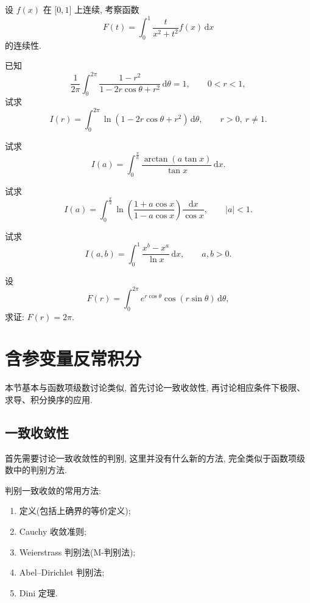 \documentclass[../数学分析培优讲义.tex]{subfiles}
\begin{document}
\begin{example}
设 $f(x)$ 在 $\lbrack0,1\rbrack$ 上连续, 考察函数
\[
    F(t)=\int_0^1\dfrac{t}{x^2+t^2}f(x)\,\mathrm{d}x
\]
的连续性.
\end{example}
\exampleblank

\begin{example}
已知
\[
    \dfrac{1}{2\pi}\int_0^{2\pi}\dfrac{1-r^2}{1-2r\cos\theta+r^2}\,\mathrm{d}\theta=1,
    \qquad 0<r<1,
\]
试求
\[
    I(r)=\int_0^{2\pi}\ln(1-2r\cos\theta+r^2)\,\mathrm{d}\theta,
    \qquad r>0,\ r\ne1.
\]
\end{example}
\exampleblank

\begin{example}
试求
\[
    I(a)=\int_0^{\frac{\pi}{a}}\dfrac{\arctan(a\tan x)}{\tan x}\,\mathrm{d}x.
\]
\end{example}
\exampleblank

\begin{example}
试求
\[
    I(a)=\int_0^{\frac{\pi}{2}}\ln\left(\dfrac{1+a\cos x}{1-a\cos x}\right)\dfrac{\mathrm{d}x}{\cos x},
    \qquad |a|<1.
\]
\end{example}
\exampleblank

\begin{example}
试求
\[
    I(a,b)=\int_0^1\dfrac{x^b-x^a}{\ln x}\,\mathrm{d}x,
    \qquad a,b>0.
\]
\end{example}
\exampleblank

\begin{example}
设
\[
    F(r)=\int_0^{2\pi}e^{r\cos\theta}\cos(r\sin\theta)\,\mathrm{d}\theta,
\]
求证: $F(r)=2\pi$.
\end{example}
\exampleblank


\newpage

\section{含参变量反常积分}

本节基本与函数项级数讨论类似, 首先讨论一致收敛性, 再讨论相应条件下极限、求导、积分换序的应用.


\newpage

\subsection{一致收敛性}

首先需要讨论一致收敛性的判别, 这里并没有什么新的方法, 完全类似于函数项级数中的判别方法.

判别一致收敛的常用方法:
\begin{enumerate}[label=\textcircled{\arabic*},leftmargin=2.2em]
    \item 定义(包括上确界的等价定义);
    \item Cauchy 收敛准则;
    \item Weierstrass 判别法(M-判别法);
    \item Abel--Dirichlet 判别法;
    \item Dini 定理.
\end{enumerate}
\end{document}
